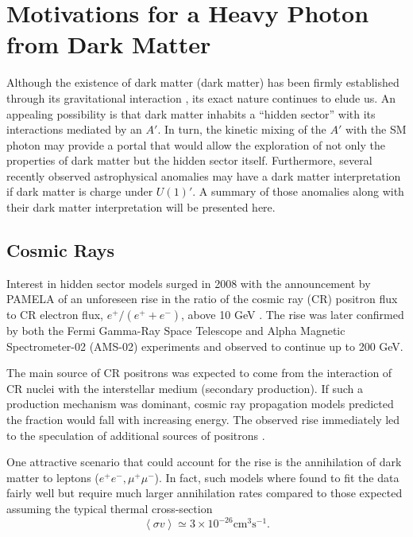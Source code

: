 \section{Motivations for a Heavy Photon from Dark Matter} \label{sec:mot_dm}

Although the existence of dark matter (dark matter) has been firmly established through its
gravitational interaction 
\cite{Zwicky:1933gu, Rubin:1980zd, Clowe:2006eq, Adam:2015rua}, its exact nature
continues to elude us. An appealing
possibility is that dark matter inhabits a ``hidden sector'' with its interactions 
mediated by an $A'$.  In turn, the kinetic mixing of the $A'$ with the SM 
photon may provide a portal that would allow the exploration of not only the 
properties of dark matter but the hidden sector itself.  Furthermore, several recently
observed astrophysical anomalies \cite{Adriani:2008zr, ackermann2012, aguilar2013, 
hooper2011, linden2011, abazajian2012, hooper2013, Bulbul:2014sua}
may have a dark matter interpretation if dark matter is
charge under $U(1)'$.  A summary of those anomalies along with their dark matter
interpretation will be presented here.

\subsection{Cosmic Rays}

Interest in hidden sector models surged in 2008 with the announcement by 
PAMELA of an unforeseen rise in the ratio of the cosmic ray (CR) positron flux
to CR electron flux, $e^{+}/(e^{+} + e^{-})$, above 10 GeV \cite{Adriani:2008zr}.
The rise was later confirmed by both the 
Fermi Gamma-Ray Space Telescope \cite{ackermann2012} and Alpha Magnetic 
Spectrometer-02 (AMS-02) \cite{aguilar2013} experiments and observed to continue
up to 200 GeV. 

The main source of CR positrons 
was expected to come from the interaction of CR nuclei with the interstellar 
medium (secondary production).  If such a production mechanism was dominant, 
cosmic ray propagation models predicted the fraction would fall with increasing
energy.  The observed rise immediately led to the speculation of additional sources of 
positrons \cite{yin2013, linden2013}.

One attractive scenario that could account for the rise is the annihilation of
dark matter to leptons ($e^+e^-, \mu^+\mu^-$). In fact, such models where found to fit 
the data fairly well but require much 
larger annihilation rates compared to those expected assuming the typical 
thermal cross-section \cite{Cholis:2008hb}
\begin{equation}
    \left \langle \sigma v \right \rangle \simeq 3 \times 10^{-26} \text{cm}^3 \text{s}^{-1}.
\end{equation}

